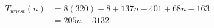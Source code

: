 \begin{align}
\label{eq:analyse-argetcontour-all}
T_{worst}(n)& =
8(320) - 8 + 137n - 401 + 68n - 163
\\
& =
205n - 3132
\nonumber
\end{align}
